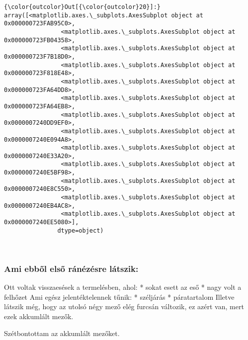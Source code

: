 \documentclass[11pt]{article}
\begin{document}
\begin{Verbatim}[commandchars=\\\{\}]
{\color{outcolor}Out[{\color{outcolor}20}]:} array([<matplotlib.axes.\_subplots.AxesSubplot object at 0x000000723FAB95C0>,
                <matplotlib.axes.\_subplots.AxesSubplot object at 0x000000723FB04358>,
                <matplotlib.axes.\_subplots.AxesSubplot object at 0x000000723F7B18D0>,
                <matplotlib.axes.\_subplots.AxesSubplot object at 0x000000723F818E48>,
                <matplotlib.axes.\_subplots.AxesSubplot object at 0x000000723FA64DD8>,
                <matplotlib.axes.\_subplots.AxesSubplot object at 0x000000723FA64EB8>,
                <matplotlib.axes.\_subplots.AxesSubplot object at 0x0000007240DD9EF0>,
                <matplotlib.axes.\_subplots.AxesSubplot object at 0x0000007240E094A8>,
                <matplotlib.axes.\_subplots.AxesSubplot object at 0x0000007240E33A20>,
                <matplotlib.axes.\_subplots.AxesSubplot object at 0x0000007240E5BF98>,
                <matplotlib.axes.\_subplots.AxesSubplot object at 0x0000007240E8C550>,
                <matplotlib.axes.\_subplots.AxesSubplot object at 0x0000007240EB4AC8>,
                <matplotlib.axes.\_subplots.AxesSubplot object at 0x0000007240EE5080>],
               dtype=object)
\end{Verbatim}
            
    \begin{center}
    \end{center}
    { \hspace*{\fill} \\}
    
    \subsubsection{Ami ebből első ránézésre
látszik:}\label{ami-ebbux151l-elsux151-ruxe1nuxe9zuxe9sre-luxe1tszik}

Ott voltak visszaesések a termelésben, ahol: * sokat esett az eső * nagy
volt a felhőzet Ami egész jelentéktelennek tűnik: * széljárás *
páratartalom Illetve látszik még, hogy az utolsó négy mező elég furcsán
változik, ez azért van, mert ezek akkumlált mezők.

    Szétbontottam az akkumlált mezőket.
\end{document}

